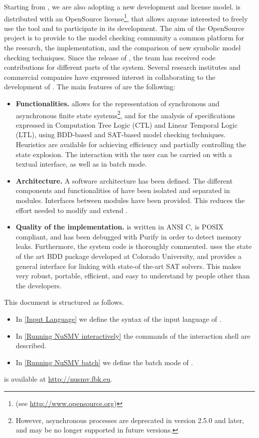 Starting from \nusmvTwo, we are also adopting a new development and
license model. \nusmvTwo is distributed with an OpenSource
license\footnote{(see \url{http://www.opensource.org})}, that
allows anyone interested to freely use the tool and to participate in
its development. The aim of the \nusmv OpenSource project is to
provide to the model checking community a common platform for the
research, the implementation, and the comparison of new symbolic model
checking techniques. Since the release of \nusmvTwo, the \nusmv team
has received code contributions for different parts of the system.
Several research institutes and commercial companies have expressed
interest in collaborating to the development of \nusmv. The main
features of \nusmv are the following:
\begin{itemize}
\item {\bf Functionalities.}
\nusmv allows for the representation of synchronous and
asynchronous finite state systems\footnote{However, asynchronous
processes are deprecated in version 2.5.0 and later, and may be no
longer supported in future versions.}, and for the analysis of
specifications expressed in Computation Tree Logic (CTL) and Linear
Temporal Logic (LTL), using BDD-based and SAT-based model checking
techniques.  Heuristics are available for achieving efficiency and
partially controlling the state explosion.  The interaction with
the user can be carried on with a textual interface, as well as in
batch mode.
\item{\bf Architecture.}
A software architecture has been defined. The different components and
functionalities of \nusmv have been isolated and separated in
modules. Interfaces between modules have been provided. This 
reduces the effort needed to modify and extend \nusmv.
\item{\bf Quality of the implementation.}
\nusmv is written in ANSI C, is POSIX compliant, and has been
debugged with Purify in order to detect memory leaks. Furthermore, the
system code is thoroughly commented. \nusmv uses the state of the
art BDD package developed at Colorado University, and provides a general
interface for linking with state-of the-art SAT solvers. This makes
\nusmv very robust, portable, efficient, and easy to
understand by people other than the developers.
\end{itemize}
This document is structured as follows.
\begin{itemize}
\item In \cref{Input Language} we define the syntax of the input language of
\nusmv.
\item In \cref{Running NuSMV interactively} the commands of the
interaction shell are described.
\item In \cref{Running NuSMV batch}
we define the batch mode of \nusmv.
\end{itemize}
\nusmv is available at \url{http://nusmv.fbk.eu}.
